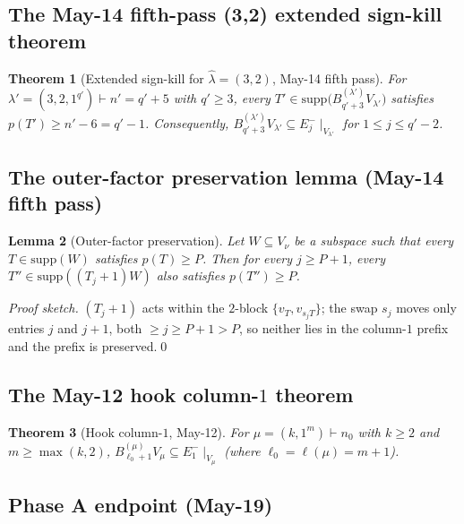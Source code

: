 \documentclass[11pt]{article}
\newtheorem{theorem}{Theorem}
\newtheorem{lemma}[theorem]{Lemma}
\theoremstyle{definition}
\newcommand{\hatl}{\widehat\lambda}
\newcommand{\supp}{\mathrm{supp}}
\begin{document}
\subsection{The May-14 fifth-pass (3,2) extended sign-kill theorem}

\begin{theorem}[Extended sign-kill for $\hatl = (3, 2)$, May-14 fifth pass]\label{thm:32-prefix}
For $\lambda' = (3, 2, 1^{q'}) \vdash n' = q' + 5$ with $q' \ge 3$,
every $T' \in \supp\bigl(B^{(\lambda')}_{q'+3} V_{\lambda'}\bigr)$
satisfies $p(T') \ge n' - 6 = q' - 1$.  Consequently,
$B^{(\lambda')}_{q'+3} V_{\lambda'} \subseteq E_j^-\!\mid_{V_{\lambda'}}$
for $1 \le j \le q' - 2$.
\end{theorem}

\subsection{The outer-factor preservation lemma (May-14 fifth pass)}

\begin{lemma}[Outer-factor preservation]\label{lem:outer-preserve}
Let $W \subseteq V_\nu$ be a subspace such that every $T \in \supp(W)$
satisfies $p(T) \ge P$.  Then for every $j \ge P + 1$,
every $T'' \in \supp((T_j{+}1) W)$ also satisfies $p(T'') \ge P$.
\end{lemma}

\begin{proof}[Proof sketch]
$(T_j+1)$ acts within the $2$-block $\{v_T, v_{s_j T}\}$; the swap $s_j$
moves only entries $j$ and $j+1$, both $\ge j \ge P + 1 > P$, so neither
lies in the column-$1$ prefix and the prefix is preserved.\qed
\end{proof}

\subsection{The May-12 hook column-$1$ theorem}

\begin{theorem}[Hook column-$1$, May-12]\label{thm:hook-E1minus}
For $\mu = (k, 1^m) \vdash n_0$ with $k \ge 2$ and $m \ge \max(k, 2)$,
$B^{(\mu)}_{\ell_0+1} V_\mu \subseteq E_1^-\!\mid_{V_\mu}$ (where
$\ell_0 = \ell(\mu) = m + 1$).
\end{theorem}

\subsection{Phase A endpoint (May-19)}
\end{document}
